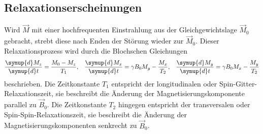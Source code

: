 \subsection{Relaxationserscheinungen}
Wird $\vec{M}$ mit einer hochfrequenten Einstrahlung
aus der Gleichgewichtslage $\vec{M}_0$
gebracht, strebt diese
nach Enden der Störung wieder zur $\vec{M}_0$.
Dieser Relaxationsprozess wird durch die
Blochschen Gleichungen
\begin{align}
  \frac{\symup{d}M_z}{\symup{d}t}=\frac{M_0-M_z}{T_1},&
  &\frac{\symup{d}M_x}{\symup{d}t}=\gamma B_0 M_y-\frac{M_x}{T_2},&
  &\frac{\symup{d}M_y}{\symup{d}t}=\gamma B_0 M_x-\frac{M_y}{T_2} \label{eqn:bloch}
\end{align}
beschrieben.
Die Zeitkonstante $T_1$ entspricht
der longitudinalen oder Spin-Gitter-Relaxationszeit, sie
beschreibt die Änderung der Magnetisierungskomponente parallel zu
$\vec{B}_0$. Die Zeitkonstante $T_2$ hingegen entspricht
der transversalen oder Spin-Spin-Relaxationszeit, sie
beschreibt die Änderung der Magnetisierungskomponenten
senkrecht zu $\vec{B}_0$.

